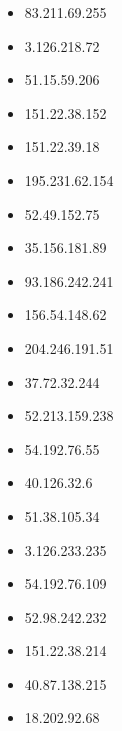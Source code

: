 \documentclass{article}
\begin{document}
\begin{itemize}
            \item 83.211.69.255
        
            \item 3.126.218.72
        
            \item 51.15.59.206
        
            \item 151.22.38.152
        
            \item 151.22.39.18
        
            \item 195.231.62.154
        
            \item 52.49.152.75
        
            \item 35.156.181.89
        
            \item 93.186.242.241
        
            \item 156.54.148.62
        
            \item 204.246.191.51
        
            \item 37.72.32.244
        
            \item 52.213.159.238
        
            \item 54.192.76.55
        
            \item 40.126.32.6
        
            \item 51.38.105.34
        
            \item 3.126.233.235
        
            \item 54.192.76.109
        
            \item 52.98.242.232
        
            \item 151.22.38.214
        
            \item 40.87.138.215
        
            \item 18.202.92.68
        

\end{itemize}
\end{document}
